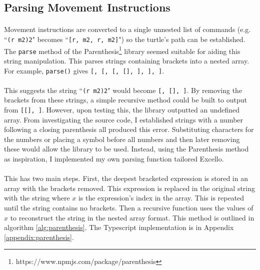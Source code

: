 \subsection{Parsing Movement Instructions}

\paragraph{} Movement instructions are converted to a single unnested list of commands (e.g. ``\texttt{(r m2)2}" becomes ``\texttt{[r, m2, r, m2]}") so the turtle's path can be established. The \texttt{parse} method of the Parenthesis\footnote{https://www.npmjs.com/package/parenthesis} library seemed suitable for aiding this string manipulation. This parses strings containing brackets into a nested array. For example, \texttt{parse(\textcolor[rgb]{0,0.7,0}{})} gives \texttt{[\textcolor[rgb]{0,0.7,0}{}, [\textcolor[rgb]{0,0.7,0}{\upquote{b[}}, [\textcolor[rgb]{0,0.7,0}{}, [\textcolor[rgb]{0,0.7,0}{}], \textcolor[rgb]{0,0.7,0}{\upquote{\}}}], \textcolor[rgb]{0,0.7,0}{\upquote{]}}], \textcolor[rgb]{0,0.7,0}{\upquote{)}}]}.

\paragraph{} This suggests the string ``\texttt{(r m2)2}" would become \texttt{[\upquote{(}, [], ]}.  By removing the brackets from these strings, a simple recursive method could be built to output \texttt{} from \texttt{[[], ]}. However, upon testing this, the library outputted an undefined array. From investigating the source code, I established strings with a number following a closing parenthesis all produced this error. Substituting characters for the numbers or placing a symbol before all numbers and then later removing these would allow the library to be used. Instead, using the Parenthesis method as inspiration, I implemented my own parsing function tailored Excello.

\paragraph{} This has two main steps. First, the deepest bracketed expression is stored in an array with the brackets removed. This expression is replaced in the original string with the string  where $x$ is the expression's index in the array. This is repeated until the string contains no brackets. Then a recursive function uses the values of $x$ to reconstruct the string in the nested array format. This method is outlined in algorithm \ref{alg:parenthesis}. The Typescript implementation is in Appendix \ref{appendix:parenthesis}.

